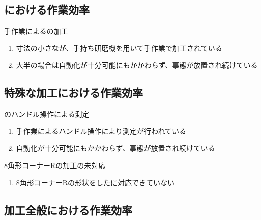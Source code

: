 \subsection{\EndFaceChamferMilling における作業効率}

\begin{Issues}{手作業による\EndFaceChamferMilling の加工}
\begin{enumerate}[label=\sarrow]
\item[{\sarrow[red]}]寸法の小さな\EndFaceChamferMilling が、手持ち研磨機を用いて手作業で加工されている
\item[{\sarrow[red]}]大半の場合は自動化が十分可能にもかかわらず、事態が放置され続けている
\end{enumerate}
\end{Issues}


\subsection{特殊な加工における作業効率}

\begin{Issues}{\CurvedOutcutMilling のハンドル操作による測定}
\begin{enumerate}[label=\sarrow]
\item[{\sarrow[red]}]手作業によるハンドル操作により測定が行われている
\item[{\sarrow[red]}]自動化が十分可能にもかかわらず、事態が放置され続けている
\end{enumerate}
\end{Issues}

\begin{Issues}{\Keyway 8角形コーナーRの加工の未対応}
\begin{enumerate}[label=\sarrow]
\item[{\sarrow[red]}]8角形コーナーRの形状をした\KeywayMilling に対応できていない
\end{enumerate}
\end{Issues}


\clearpage
\subsection{加工全般における作業効率}

